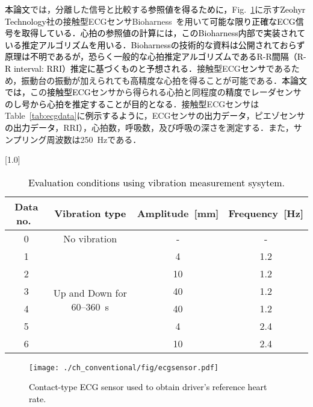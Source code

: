 {\textcolor{black}{本論文}では，分離した信号と比較する\textcolor{black}{参照値を得るために，}Fig.~\ref{fig:ecgsensor}に示す\textcolor{black}{Zeohyr Technology}社の接触型ECGセンサBioharness~\cite{bioharness}を用いて\textcolor{black}{可能な限り正確なECG信号を取得している．心拍の参照値の計算には，このBioharness内部で実装されている推定アルゴリズムを用いる．Bioharnessの技術的な資料は公開されておらず原理は不明であるが，恐らく一般的な心拍推定アルゴリズムであるR-R間隔（R-R interval: RRI）推定に基づくものと予想される．}接触型ECG\textcolor{black}{センサ}であるため，振動台の振動が加えられても高精度な心拍を得ることが可能である．\textcolor{black}{本論文では，}この\textcolor{black}{接触型ECG}センサから得られる心拍と同程度の\textcolor{black}{精度で}レーダセンサ\textcolor{black}{のし号から心拍を推定することが目的となる}．接触型ECGセンサはTable~\ref{tab:ecgdata}に\textcolor{black}{例示するように}，ECGセンサ\textcolor{black}{の出力データ}，ピエゾセンサ\textcolor{black}{の出力データ}，RRI），心拍数，呼吸数，及び呼吸の深さを測定する．また，サンプリング周波数は250~Hzである．}


\begin{table}[tb]
  \caption{\textcolor{black}{Evaluation conditions using vibration measurement sysytem.}}
  \centering
  \scalebox{1.0}[1.0]{
  \begin{tabular}{|c|c|c|c|} \hline
    Data no.~ & Vibration \textcolor{black}{type} & Amplitude~[mm] & Frequency~[Hz] \\ \hline \hline
    0 & No vibration & - & - \\ \hline
    1 & \multirow{6}{*}{Up and Down for 60--360~s} & 4 & 1.2  \\ \cline{1-1} \cline{3-4}
    2 & & 10 & 1.2 \\ \cline{1-1} \cline{3-4}
    3 & & 40 & 1.2 \\ \cline{1-1} \cline{3-4}
    4 & & 40 & 1.2 \\ \cline{1-1} \cline{3-4}
    5 & & 4 & 2.4 \\ \cline{1-1} \cline{3-4}
    6 & & 10 & 2.4 \\ \hline
  \end{tabular}
  }
  \label{tab:vibevacondition}
\end{table}


\begin{figure}[tb]
\centering
\texttt{[image: ./ch\_conventional/fig/ecgsensor.pdf]}
\caption{\textcolor{black}{Contact\textcolor{black}{-type} ECG sensor \cite{bioharness} \textcolor{black}{used to obtain driver's reference heart rate}.}}
\label{fig:ecgsensor}
\end{figure}

